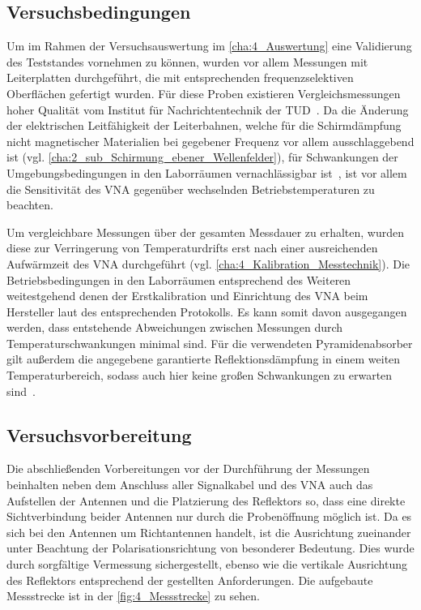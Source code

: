 

\subsection{Versuchsbedingungen}

Um im Rahmen der Versuchsauswertung im \Abschnitt\ref{cha:4_Auswertung} eine Validierung des Teststandes vornehmen zu können, wurden vor allem Messungen mit Leiterplatten durchgeführt, die mit entsprechenden \mbox{frequenzselektiven} Oberflächen gefertigt wurden. Für diese Proben existieren Vergleichsmessungen hoher Qualität vom Institut für Nachrichtentechnik der TUD~\cite{FSS_Toedter_Diplomarbeit}. Da die Änderung der elektrischen Leitfähigkeit der Leiterbahnen, welche für die Schirmdämpfung nicht magnetischer Materialien bei gegebener Frequenz vor allem ausschlaggebend ist (vgl. \Abschnitt\ref{cha:2_sub_Schirmung_ebener_Wellenfelder}), für Schwankungen der Umgebungsbedingungen in den Laborräumen vernachlässigbar ist~\cite{Materialdaten_Kupfer}, ist vor allem die Sensitivität des VNA gegenüber wechselnden Betriebstemperaturen zu beachten.
\par
\vspace{\linespace}
Um vergleichbare Messungen über der gesamten Messdauer zu erhalten, wurden diese zur Verringerung von Temperaturdrifts erst nach einer ausreichenden Aufwärmzeit des VNA durchgeführt (vgl. \Abschnitt\ref{cha:4_Kalibration_Messtechnik}). Die Betriebsbedingungen in den Laborräumen entsprechend des Weiteren weitestgehend denen der Erstkalibration und Einrichtung des VNA beim Hersteller laut des entsprechenden Protokolls. Es kann somit davon ausgegangen werden, dass entstehende Abweichungen zwischen Messungen durch Temperaturschwankungen minimal sind. Für die verwendeten Pyramidenabsorber gilt außerdem die angegebene garantierte Reflektionsdämpfung in einem weiten Temperaturbereich, sodass auch hier keine großen Schwankungen zu erwarten sind~\cite{Eco_Messtechnik_Absorber}.



\subsection{Versuchsvorbereitung}

Die abschließenden Vorbereitungen vor der Durchführung der Messungen beinhalten neben dem Anschluss aller Signalkabel und des VNA auch das Aufstellen der Antennen und die Platzierung des Reflektors so, dass eine direkte Sichtverbindung beider Antennen nur durch die Probenöffnung möglich ist. Da es sich bei den Antennen um Richtantennen handelt, ist die Ausrichtung zueinander unter Beachtung der Polarisationsrichtung von besonderer Bedeutung. Dies wurde durch sorgfältige Vermessung sichergestellt, ebenso wie die vertikale Ausrichtung des Reflektors entsprechend der gestellten Anforderungen. Die aufgebaute Messstrecke ist in der \Abb\ref{fig:4_Messstrecke} zu sehen.
\par
\vspace{\linespace}

